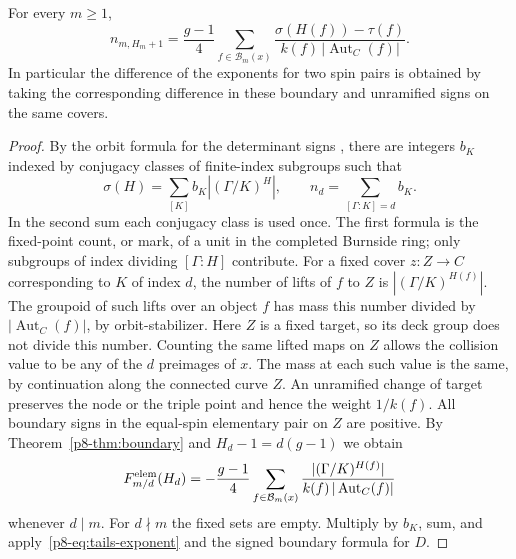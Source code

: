 \begin{theorem}\label{p8-thm:transfer}
For every $m\ge1$,
\[
 n_{m,H_m+1}
  =\frac{g-1}{4}\!
     \sum_{f\in\mathcal B_m(x)}
     \frac{\sigma(H(f))-\tau(f)}
          {k(f)\,|\operatorname{Aut}_C(f)|}.
\]
In particular the difference of the exponents for two spin pairs
is obtained by taking the corresponding difference in these
boundary and unramified signs on the same covers.
\end{theorem}
\begin{proof}
By the orbit formula for the determinant signs \cite[Theorem~16.1]{WueUnramified}, there are
integers $b_K$ indexed by conjugacy classes of finite-index subgroups
such that
\[
 \sigma(H)=\sum_{[K]} b_K |(\Gamma/K)^H|,
 \qquad n_d=\sum_{[\Gamma:K]=d} b_K .
\]
In the second sum each conjugacy class is used once. The first formula
is the fixed-point count, or mark, of a unit in the completed Burnside
ring; only subgroups of index dividing $[\Gamma:H]$ contribute.
For a fixed cover $z:Z\to C$ corresponding to $K$ of index $d$,
the number of lifts of $f$ to $Z$ is $|(\Gamma/K)^{H(f)}|$.
The groupoid of such lifts over an object $f$ has mass this number
divided by $|\operatorname{Aut}_C(f)|$, by orbit-stabilizer.
Here $Z$ is a fixed target, so its deck group does not divide this
number. Counting the same lifted maps on $Z$ allows the collision
value to be any of the $d$ preimages of $x$. The mass at each such
value is the same, by continuation along the connected curve $Z$.
An unramified change of target preserves the node or the triple
point and hence the weight $1/k(f)$. All boundary signs in the
equal-spin elementary pair on $Z$ are positive. By
Theorem~\ref{p8-thm:boundary} and $H_d-1=d(g-1)$ we obtain
\[
 F_{m/d}^{\rm elem}(H_d)=
 -\frac{g-1}{4}
  \sum_{f\in\mathcal B_m(x)}
  \frac{|(\Gamma/K)^{H(f)}|}
       {k(f)\,|\operatorname{Aut}_C(f)|}
\]
whenever $d\mid m$. For $d\nmid m$ the fixed sets are empty.
Multiply by $b_K$, sum, and apply~\eqref{p8-eq:tails-exponent} and
the signed boundary formula for $D$.
\end{proof}

